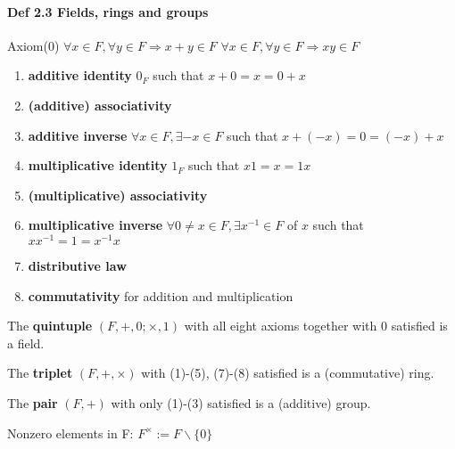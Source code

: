 \paragraph{Def 2.3 Fields, rings and groups} 


Axiom(0) $\forall x \in F, \forall y \in F \Rightarrow x+y \in F$ $\forall x \in F, \forall y \in F \Rightarrow xy \in F$

\begin{enumerate}
    \item \textbf{additive identity} $0_F$ such that $x+0=x=0+x$
    \item \textbf{(additive) associativity}
    \item \textbf{additive inverse} $\forall x \in F, \exists -x \in F$ such that $x+(-x)=0=(-x)+x$
    \item \textbf{multiplicative identity} $1_F$ such that $x1=x=1x$
    \item \textbf{(multiplicative) associativity} 
    \item \textbf{multiplicative inverse} $\forall 0\neq x \in F, \exists x^{-1} \in F$ of $x$ such that $xx^{-1}=1=x^{-1}x$
    \item \textbf{distributive law}
    \item \textbf{commutativity} for addition and multiplication
\end{enumerate}

\noindent
The \textbf{quintuple} $(F,+,0;\times,1)$ with all eight axioms together with 0 satisfied is a field.

\noindent
The \textbf{triplet} $(F,+,\times)$ with (1)-(5), (7)-(8) satisfied is a (commutative) ring.

\noindent
The \textbf{pair} $(F, +)$ with only (1)-(3) satisfied is a (additive) group.

\noindent
Nonzero elements in F: $F^{\times}:=F\backslash \{0\}$

